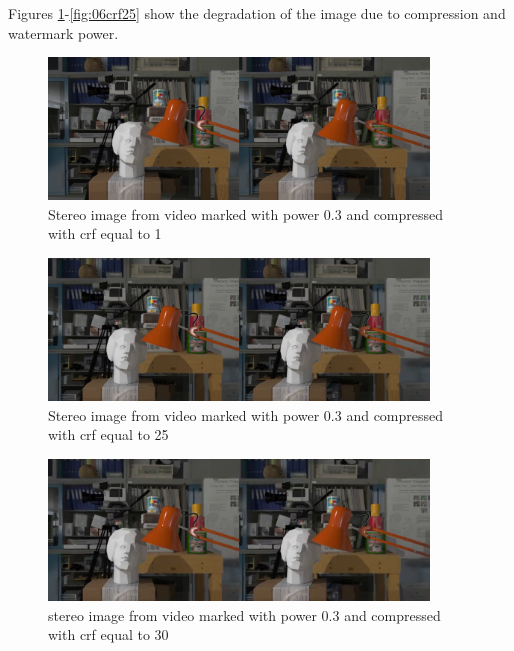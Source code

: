 Figures \ref{fig:03crf1}-\ref{fig:06crf25} show the degradation of the image due to compression and watermark power.


\begin{figure}[h!]
\centering
\includegraphics[width=0.9\textwidth]{./img/03_crf1_gt.png}
\caption{\small{Stereo image from video marked with power 0.3 and compressed with crf equal to 1 }}
\label{fig:03crf1}
\end{figure}
\begin{figure}[h!]
\centering
\includegraphics[width=0.9\textwidth]{./img/03_crf25_gt.png}
\caption{\small{Stereo image from video marked with power 0.3 and compressed with crf equal to 25 }}
\label{fig:03crf25}
\end{figure}
\begin{figure}[h!]
\centering
\includegraphics[width=0.9\textwidth]{./img/03_crf30_gt.png}
\caption{\small{stereo image from video marked with power 0.3 and compressed with crf equal to 30 }}
\label{fig:03crf30}
\end{figure}


